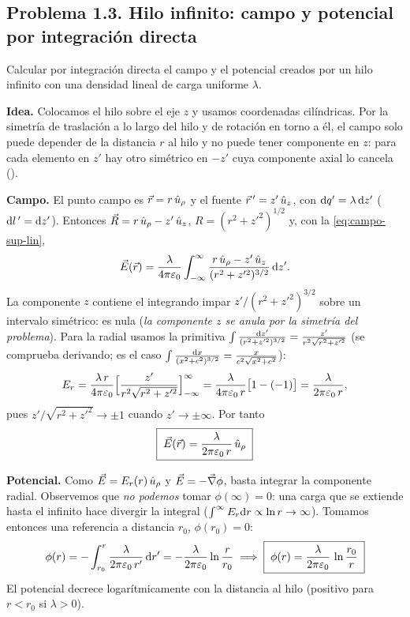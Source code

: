 \subsection{Problema 1.3. Hilo infinito: campo y potencial por integración directa}\label{sem:hilo}
\begin{ejercicio}\label{ejer:hilo}
Calcular por integración directa el campo y el potencial creados por un hilo infinito con una densidad lineal de carga uniforme $\lambda$.
\end{ejercicio}

\begin{resolucion}
\textbf{Idea.} Colocamos el hilo sobre el eje $z$ y usamos coordenadas cilíndricas. Por la simetría de traslación a lo largo del hilo y de rotación en torno a él, el campo solo puede depender de la distancia $r$ al hilo y
no puede tener componente en $z$: para cada elemento en $z'$ hay otro simétrico en $-z'$ cuya componente axial lo cancela ().

\textbf{Campo.} El punto campo es $\vec{r}=r\,\hat{u}_{\rho}$ y el fuente $\vec{r}\,'=z'\,\hat{u}_{z}$, con $\mathrm{d} q'=\lambda\,\mathrm{d} z'$ ($\mathrm{d} l\,'=\mathrm{d} z'$). Entonces
$\vec{R}=r\,\hat{u}_{\rho}-z'\,\hat{u}_{z}$, $R=(r^{2}+z'^{2})^{1/2}$ y, con la \cref{eq:campo-sup-lin},
\[
  \vec{E}(\vec{r})=\frac{\lambda}{4\pi\varepsilon_{0}}\int_{-\infty}^{\infty}\frac{r\,\hat{u}_{\rho}-z'\,\hat{u}_{z}}{(r^{2}+z'^{2})^{3/2}}\,\mathrm{d} z' .
\]
La componente $z$ contiene el integrando impar $z'/(r^{2}+z'^{2})^{3/2}$ sobre un intervalo simétrico: es nula (\emph{la componente $z$ se anula por la simetría del problema}). Para la radial usamos la primitiva
$\int\frac{\mathrm{d} z'}{(r^{2}+z'^{2})^{3/2}}=\frac{z'}{r^{2}\sqrt{r^{2}+z'^{2}}}$ (se comprueba derivando; es el caso $\int\frac{\mathrm{d} x}{(x^{2}+c^{2})^{3/2}}=\frac{x}{c^{2}\sqrt{x^{2}+c^{2}}}$):
\[
  E_r=\frac{\lambda\,r}{4\pi\varepsilon_{0}}\Bigl[\frac{z'}{r^{2}\sqrt{r^{2}+z'^{2}}}\Bigr]_{-\infty}^{\infty}=\frac{\lambda}{4\pi\varepsilon_{0}\,r}\bigl[1-(-1)\bigr]=\frac{\lambda}{2\pi\varepsilon_{0}\,r},
\]
pues $z'/\sqrt{r^{2}+z'^{2}}\to\pm1$ cuando $z'\to\pm\infty$. Por tanto
\[
  \boxed{\;\vec{E}(\vec{r})=\frac{\lambda}{2\pi\varepsilon_{0}\,r}\,\hat{u}_{\rho}\;}
\]

\textbf{Potencial.} Como $\vec{E}=E_r(r)\,\hat{u}_{\rho}$ y $\vec{E}=-\vec{\nabla}\phi$, basta integrar la componente radial. Observemos que \emph{no podemos} tomar $\phi(\infty)=0$: una carga que se extiende hasta el infinito hace divergir la integral
($\int^{\infty}E_r\mathrm{d} r\propto\ln r\to\infty$). Tomamos entonces una referencia a distancia $r_0$, $\phi(r_0)=0$:
\[
  \phi(r)=-\int_{r_0}^{r}\frac{\lambda}{2\pi\varepsilon_{0}\,r'}\,\mathrm{d} r'=-\frac{\lambda}{2\pi\varepsilon_{0}}\ln\frac{r}{r_0}
  \;\Longrightarrow\;\boxed{\;\phi(r)=\frac{\lambda}{2\pi\varepsilon_{0}}\,\ln\frac{r_0}{r}\;}
\]
El potencial decrece logarítmicamente con la distancia al hilo (positivo para $r<r_0$ si $\lambda>0$).
\end{resolucion}

